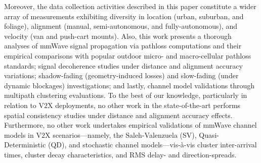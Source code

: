 \documentclass[10pt, twocolumn]{IEEEtran}
\renewcommand{\tabcolsep}{2pt}
\begin{document}
Moreover, the data collection activities described in this paper constitute a wider array of measurements exhibiting diversity in location (urban, suburban, and foliage), alignment (manual, semi-autonomous, and fully-autonomous), and velocity (van and push-cart mounts). Also, this work presents a thorough analyses of mmWave signal propagation via pathloss computations and their empirical comparisons with popular outdoor micro- and macro-cellular pathloss standards; signal decoherence studies under distance and alignment accuracy variations; shadow-fading (geometry-induced losses) and slow-fading (under dynamic blockages) investigations; and lastly, channel model validations through multipath clustering evaluations. To the best of our knowledge, particularly in relation to V$2$X deployments, no other work in the state-of-the-art performs spatial consistency studies under distance and alignment accuracy effects. Furthermore, no other work undertakes empirical validations of mmWave channel models in V$2$X scenarios---namely, the Saleh-Valenzuela (SV), Quasi-Deterministic (QD), and stochastic channel models---vis-\`{a}-vis cluster inter-arrival times, cluster decay characteristics, and RMS delay- and direction-spreads.
\renewcommand{\tabcolsep}{4.5pt}
\end{document}
